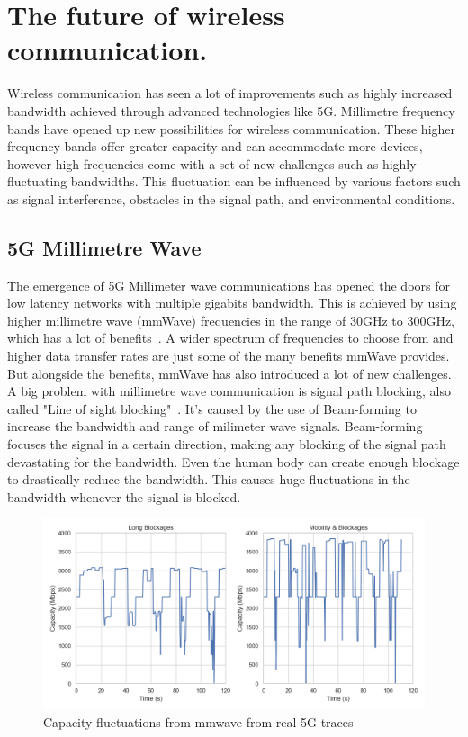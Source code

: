 \documentclass[a4paper,english, 11pt]{report}
\begin{document}
\section{The future of wireless communication.}
Wireless communication has seen a lot of improvements such as highly increased bandwidth achieved through advanced technologies like 5G. Millimetre frequency bands have opened up new possibilities for wireless communication. These higher frequency bands offer greater capacity and can accommodate more devices, however high frequencies come with a set of new challenges such as highly fluctuating bandwidths. This fluctuation can be influenced by various factors such as signal interference, obstacles in the signal path, and environmental conditions.

\subsection{5G Millimetre Wave}
The emergence of 5G Millimeter wave communications has opened the doors for low latency networks with multiple gigabits bandwidth. This is achieved by using higher millimetre wave (mmWave) frequencies in the range of 30GHz to 300GHz, which has a lot of benefits~\cite{Agrawal_Sharma_2016}. A wider spectrum of frequencies to choose from and higher data transfer rates are just some of the many benefits mmWave provides. But alongside the benefits, mmWave has also introduced a lot of new challenges.\\

A big problem with millimetre wave communication is signal path blocking, also called "Line of sight blocking"~\cite{mmwave_blocking}. It's caused by the use of Beam-forming to increase the bandwidth and range of milimeter wave signals. Beam-forming focuses the signal in a certain direction, making any blocking of the signal path devastating for the bandwidth. Even the human body can create enough blockage to drastically reduce the bandwidth. This causes huge fluctuations in the bandwidth whenever the signal is blocked.\\

\begin{figure}[h!] %
	\centering
	\includegraphics[scale=0.33]{../diagrams/witestlab/lb_mobb.png}
  	\caption{Capacity fluctuations from mmwave from real 5G traces~\cite{Srivastava_Fund_Panwar_2020}}
  	\label{fig:blockage}
\end{figure}
\end{document}
